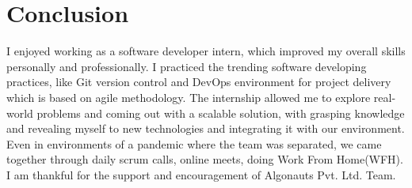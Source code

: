 \chapter{Conclusion}

I enjoyed working as a software developer intern, which improved my overall skills personally and professionally. I practiced the trending software developing practices, like Git version control and DevOps environment for project delivery which is based on agile methodology. 
The internship allowed me to explore real-world problems and coming out with a scalable solution, with grasping knowledge and revealing myself to new technologies and integrating it with our environment.
Even in environments of a pandemic where the team was separated, we came together through daily scrum calls, online meets, doing Work From Home(WFH).
I am thankful for the support and encouragement of Algonauts Pvt. Ltd. Team.
